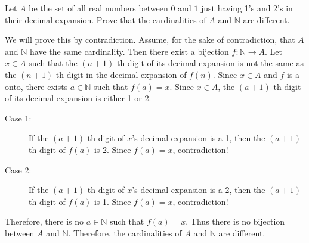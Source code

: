 \documentclass{article}
\theoremstyle{definition}
\begin{document}
\begin{question}
    Let $A$ be the set of all real numbers between $0$ and $1$ just having 1's and 2's in their decimal expansion. Prove that the cardinalities of $A$ and $\mathbb{N}$ are different.
\end{question}
\begin{solution}
We will prove this by contradiction. Assume, for the sake of contradiction, that $A$ and $\mathbb{N}$ have the same cardinality. Then there exist a bijection $f:\mathbb{N}\to A$. Let $x\in A$ such that the $(n+1)$-th digit of its decimal expansion is not the same as the $(n+1)$-th digit in the decimal expansion of $f(n)$. Since $x\in A$ and $f$ is a onto, there exists $a\in \mathbb{N}$ such that $f(a)=x$. Since $x\in A$, the $(a+1)$-th digit of its decimal expansion is either 1 or 2.
	\begin{description}
	\item[Case 1:] If the $(a+1)$-th digit of $x$'s decimal expansion is a 1, then the $(a+1)$-th digit of $f(a)$ is 2. Since $f(a)=x$, contradiction!
	\item[Case 2:] If the $(a+1)$-th digit of $x$'s decimal expansion is a 2, then the $(a+1)$-th digit of $f(a)$ is 1. Since $f(a)=x$, contradiction!
	\end{description}
	Therefore, there is no $a\in \mathbb{N}$ such that $f(a)=x$. Thus there is no bijection between $A$ and $\mathbb{N}$. Therefore, the cardinalities of $A$ and $\mathbb{N}$ are different.
\end{solution}
\end{document}
